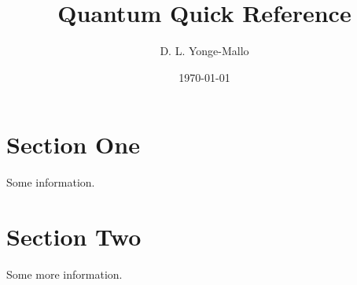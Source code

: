 \documentclass[a4paper,landscape,columns=3]{CheatSheet}
\title{Quantum Quick Reference}
\author{D. L. Yonge-Mallo}
\date{\today}
\begin{document}
\maketitle
\section{Section One}
Some information.
\section{Section Two}
Some more information.
\end{document}
